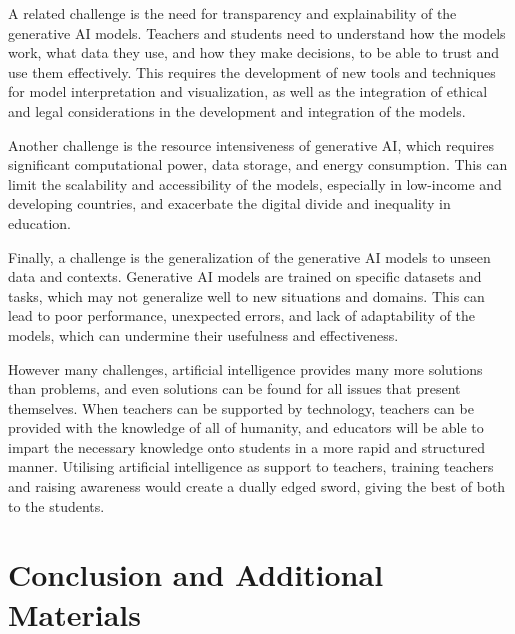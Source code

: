 \documentclass[a4paper,12pt]{report}
\begin{document}
A related challenge is the need for transparency and explainability of the generative AI models. Teachers and students need to understand how the models work, what data they use, and how they make decisions, to be able to trust and use them effectively. This requires the development of new tools and techniques for model interpretation and visualization, as well as the integration of ethical and legal considerations in the development and integration of the models.

Another challenge is the resource intensiveness of generative AI, which requires significant computational power, data storage, and energy consumption. This can limit the scalability and accessibility of the models, especially in low-income and developing countries, and exacerbate the digital divide and inequality in education.

Finally, a challenge is the generalization of the generative AI models to unseen data and contexts. Generative AI models are trained on specific datasets and tasks, which may not generalize well to new situations and domains. This can lead to poor performance, unexpected errors, and lack of adaptability of the models, which can undermine their usefulness and effectiveness.

However many challenges, artificial intelligence provides many more solutions than problems, and even solutions can be found for all issues that present themselves. When teachers can be supported by technology, teachers can be provided with the knowledge of all of humanity, and educators will be able to impart the necessary knowledge onto students in a more rapid and structured manner. Utilising artificial intelligence as support to teachers, training teachers and raising awareness would create a dually edged sword, giving the best of both to the students.

\newpage
\chapter{Conclusion and Additional Materials} \label{chap:conclusion-materials}
\newpage
\end{document}
